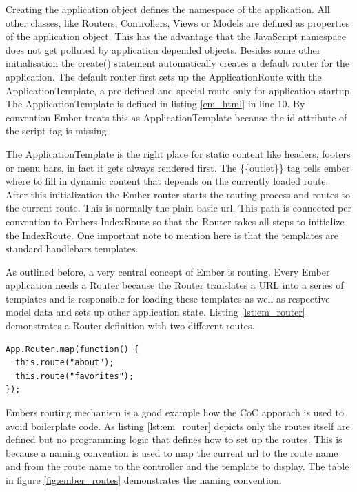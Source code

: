 Creating the application object defines the namespace of the application.
All other classes, like Routers, Controllers, Views or Models are defined as properties of the application object.
This has the advantage that the JavaScript namespace does not get polluted by application depended objects.
Besides some other initialisation the create() statement automatically creates a default router for the application.
The default router first sets up the ApplicationRoute with the ApplicationTemplate, a pre-defined and special route only for application startup.
The ApplicationTemplate is defined in listing \ref{em_html} in line 10.
By convention Ember treats this as ApplicationTemplate because the id attribute of the script tag is missing.

The ApplicationTemplate is the right place for static content like headers, footers or menu bars, in fact it gets always rendered first.
The \{\{outlet\}\} tag tells ember where to fill in dynamic content that depends on the currently loaded route.
After this initialization the Ember router starts the routing process and routes to the current route.
This is normally the plain basic url.
This path is connected per convention to Embers IndexRoute so that the Router takes all steps to initialize the IndexRoute.
One important note to mention here is that the templates are standard handlebars templates.

As outlined before, a very central concept of Ember is routing.
Every Ember application needs a Router because the Router translates a URL into a series of templates and is responsible for loading these templates as well as respective model data and sets up other application state.
Listing \ref{lst:em_router} demonstrates a Router definition with two different routes.

\begin{lstlisting}[label=lst:em_router,caption=Router Defintion in Ember]
App.Router.map(function() {
  this.route("about");
  this.route("favorites");
});
\end{lstlisting}

Embers routing mechanism is a good example how the CoC apporach is used to avoid boilerplate code. As listing \ref{lst:em_router} depicts only the routes itself are defined but no programming logic that defines how to set up the routes. 
This is because a naming convention is used to map the current url to the route name and from the route name to the controller and the template to display.
The table in figure \ref{fig:ember_routes} demonstrates the naming convention.

